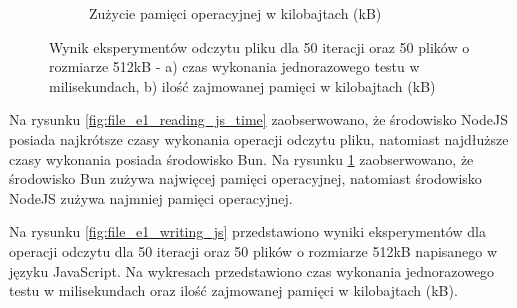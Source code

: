 \begin{figure}[H]
\begin{subfigure}[b]{0.44\textwidth}
    \caption{Zużycie pamięci operacyjnej w kilobajtach (kB)}
    \label{fig:file_e1_reading_js_memory}
  \end{subfigure}
  \hfill
  \caption{Wynik eksperymentów odczytu pliku dla 50 iteracji oraz 50 plików o rozmiarze 512kB - a) czas wykonania jednorazowego testu w milisekundach, b) ilość zajmowanej pamięci w kilobajtach (kB)}
  \label{fig:file_e1_reading_js}
\end{figure}

Na rysunku \ref{fig:file_e1_reading_js_time} zaobserwowano, że środowisko NodeJS posiada najkrótsze czasy wykonania operacji odczytu pliku, natomiast najdłuższe czasy wykonania posiada środowisko Bun. Na rysunku \ref{fig:file_e1_reading_js_memory} zaobserwowano, że środowisko Bun zużywa najwięcej pamięci operacyjnej, natomiast środowisko NodeJS zużywa najmniej pamięci operacyjnej.

Na rysunku \ref{fig:file_e1_writing_js} przedstawiono wyniki eksperymentów dla operacji odczytu dla 50 iteracji oraz 50 plików o rozmiarze 512kB napisanego w języku JavaScript. Na wykresach przedstawiono czas wykonania jednorazowego testu w milisekundach oraz ilość zajmowanej pamięci w kilobajtach (kB).

